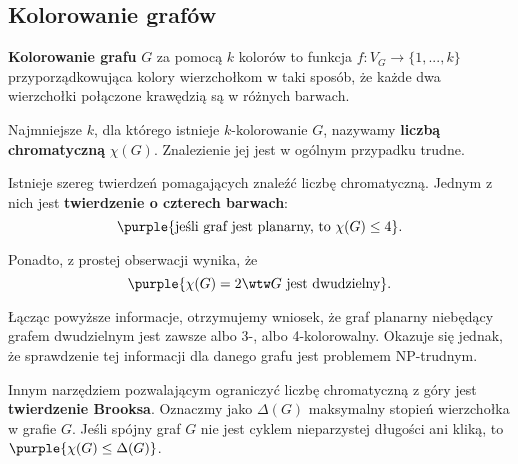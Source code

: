 \subsection{Kolorowanie grafów}

\textbf{Kolorowanie grafu} $G$ za pomocą $k$ kolorów to funkcja $f : V_G \to \{1, ..., k\}$ przyporządkowująca kolory wierzchołkom w taki sposób, że każde dwa wierzchołki połączone krawędzią są w różnych barwach.

Najmniejsze $k$, dla którego istnieje $k$-kolorowanie $G$, nazywamy \textbf{liczbą chromatyczną} $\chi(G)$. Znalezienie jej jest w ogólnym przypadku trudne. 
\bigskip

Istnieje szereg twierdzeń pomagających znaleźć liczbę chromatyczną. Jednym z nich jest \textbf{twierdzenie o czterech barwach}:
$$\purple{\text{jeśli graf jest planarny, to } \chi(G) \leq 4}.$$

Ponadto, z prostej obserwacji wynika, że
$$\purple{\chi(G) = 2 \wtw G \text{ jest dwudzielny}}.$$

Łącząc powyższe informacje, otrzymujemy wniosek, że graf planarny niebędący grafem dwudzielnym jest zawsze albo 3-, albo 4-kolorowalny. Okazuje się jednak, że sprawdzenie tej informacji dla danego grafu jest problemem NP-trudnym.
\bigskip

\begin{wrapfigure}{r}{2cm}
    \vspace{-5mm}
    
\end{wrapfigure}

Innym narzędziem pozwalającym ograniczyć liczbę chromatyczną z góry jest \textbf{twierdzenie Brooksa}. Oznaczmy jako $\Delta(G)$ maksymalny stopień wierzchołka w grafie $G$. Jeśli spójny graf $G$ nie jest cyklem nieparzystej długości ani kliką, to $\purple{\chi(G) \leq \Delta(G)}$.

